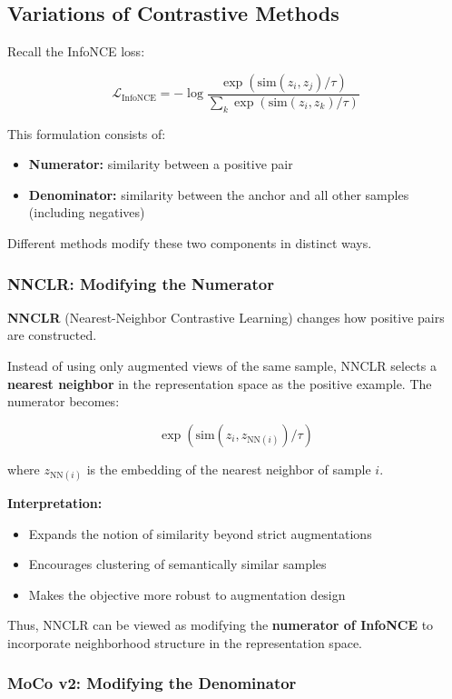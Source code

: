 \documentclass{article}
\begin{document}
\subsection{Variations of Contrastive Methods}

Recall the InfoNCE loss:

\[
\mathcal{L}_{\text{InfoNCE}} = -\log \frac{\exp(\text{sim}(z_i, z_j)/\tau)}{\sum_{k} \exp(\text{sim}(z_i, z_k)/\tau)}
\]

This formulation consists of:
\begin{itemize}
\item \textbf{Numerator:} similarity between a positive pair
\item \textbf{Denominator:} similarity between the anchor and all other samples (including negatives)
\end{itemize}

Different methods modify these two components in distinct ways.

\subsubsection*{NNCLR: Modifying the Numerator}

\textbf{NNCLR} (Nearest-Neighbor Contrastive Learning) changes how positive pairs are constructed.

Instead of using only augmented views of the same sample, NNCLR selects a \textbf{nearest neighbor} in the representation space as the positive example. The numerator becomes:

\[
\exp(\text{sim}(z_i, z_{\text{NN}(i)})/\tau)
\]

where $z_{\text{NN}(i)}$ is the embedding of the nearest neighbor of sample $i$.

\textbf{Interpretation:}
\begin{itemize}
\item Expands the notion of similarity beyond strict augmentations
\item Encourages clustering of semantically similar samples
\item Makes the objective more robust to augmentation design
\end{itemize}

Thus, NNCLR can be viewed as modifying the \textbf{numerator of InfoNCE} to incorporate neighborhood structure in the representation space.

\subsubsection*{MoCo v2: Modifying the Denominator}
\end{document}
